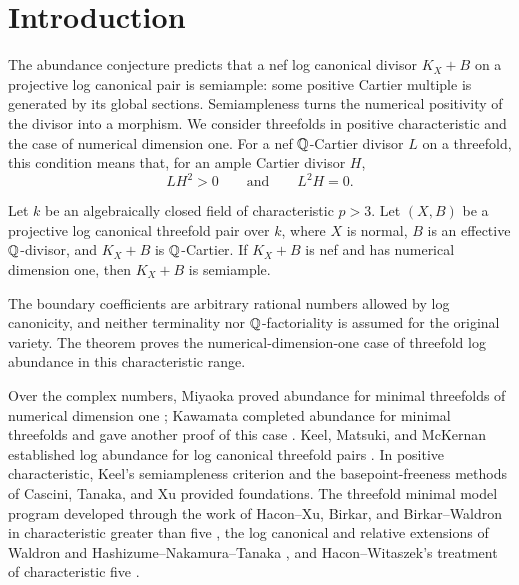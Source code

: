 \section{Introduction}
\label{sec:introduction}

The abundance conjecture predicts that a nef log canonical divisor
$K_X+B$ on a projective log canonical pair is semiample: some positive
Cartier multiple is generated by its global sections. Semiampleness
turns the numerical positivity of the divisor into a morphism. We
consider threefolds in positive characteristic and the case of numerical
dimension one. For a nef $\mathbb Q$-Cartier divisor $L$ on a threefold, this
condition means that, for an ample Cartier divisor $H$,
\[
LH^2>0\qquad\text{and}\qquad L^2H=0.
\]

\begin{theorem}\label{thm:main}
Let $k$ be an algebraically closed field of characteristic $p>3$.
Let $(X,B)$ be a projective log canonical threefold pair over $k$,
where $X$ is normal, $B$ is an effective $\mathbb Q$-divisor, and $K_X+B$
is $\mathbb Q$-Cartier. If $K_X+B$ is nef and has numerical dimension one,
then $K_X+B$ is semiample.
\end{theorem}

The boundary coefficients are arbitrary rational numbers allowed by
log canonicity, and neither terminality nor $\mathbb Q$-factoriality is assumed
for the original variety. The theorem proves the numerical-dimension-one
case of threefold log abundance in this characteristic range.

Over the complex numbers, Miyaoka proved abundance for minimal
threefolds of numerical dimension one \cite{Miyaoka}; Kawamata completed
abundance for minimal threefolds and gave another proof of this case
\cite[Section~4]{Kawamata}. Keel, Matsuki, and McKernan established
log abundance for log canonical threefold pairs \cite{KMM,KMMCorrection}. In positive
characteristic, Keel's semiampleness criterion \cite{Keel} and the
basepoint-freeness methods of Cascini, Tanaka, and Xu \cite{CTX}
provided foundations. The threefold minimal model program
developed through the work of Hacon--Xu, Birkar, and Birkar--Waldron in
characteristic greater than five \cite{HX,Birkar,BW}, the log canonical
and relative extensions of Waldron and Hashizume--Nakamura--Tanaka
\cite{Waldron,HNT}, and Hacon--Witaszek's treatment of characteristic
five \cite{HW}.


